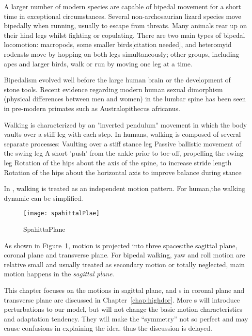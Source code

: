 A larger number of modern species are capable of bipedal movement for a short time in exceptional circumstances.
Several non-archosaurian lizard species move bipedally when running, usually to escape from threats. 
Many animals rear up on their hind legs whilst fighting or copulating. 
There are two main types of bipedal locomotion: macropods, some smaller birds[citation needed], and heteromyid rodensts move by hopping on both legs simultaneously; other groups, including apes and larger birds, walk or run by moving one leg at a time.

Bipedalism evolved well before the large human brain or the development of stone tools.
Recent evidence regarding modern human sexual dimorphism (physical differences between men and women) in the lumbar spine has been seen in pre-modern primates such as Australopithecus africanus. 





Walking is characterized by an "inverted pendulum" movement in which the body vaults over a stiff leg with each step.
In humans, walking is composed of several separate processes:
Vaulting over a stiff stance leg
Passive ballistic movement of the swing leg
A short 'push' from the ankle prior to toe-off, propelling the swing leg
Rotation of the hips about the axis of the spine, to increase stride length
Rotation of the hips about the horizontal axis to improve balance during stance

In \moit, walking is treated as an independent motion pattern.
For human,the walking dynamic can be simplified.


\begin{figure}[!htbp]
  \begin{center}
    \texttt{[image: spahittalPlae]}
    \caption{SpahittaPlane}
    \label{fig:passivekneewalker}
\end{center}
\end{figure}

As shown in Figure~\ref{fig:passivekneewalker}, motion is projected into three spaces:the sagittal plane, coronal plane and transverse plane.
For bipedal walking,
 yaw and roll motion are relative small and usually treated as secondary motion or totally neglected,  main motion happens in the \emph{sagittal plane}.




This chapter focuses on the motions in sagittal plane, and  \dof s in coronal plane and transverse plane are discussed in Chapter~\ref{chap:highdor}.
More \dof s will introduce perturbations to our model, but will not change the basic motion characteristics and adaptation tendency.
They will make the ``symmetry'' not so perfect and may cause confusions in explaining the idea. thus the discussion is delayed.




